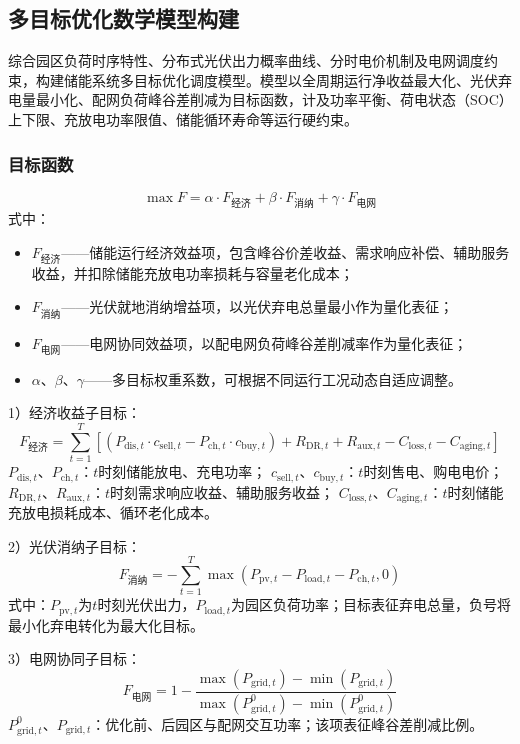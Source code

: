 \documentclass[12pt,a4paper]{article}
\begin{document}
\subsection{多目标优化数学模型构建}
综合园区负荷时序特性、分布式光伏出力概率曲线、分时电价机制及电网调度约束，构建储能系统多目标优化调度模型。模型以全周期运行净收益最大化、光伏弃电量最小化、配网负荷峰谷差削减为目标函数，计及功率平衡、荷电状态（SOC）上下限、充放电功率限值、储能循环寿命等运行硬约束。

\subsubsection{目标函数}
\[
\max F = \alpha \cdot F_{\text{经济}} + \beta \cdot F_{\text{消纳}} + \gamma \cdot F_{\text{电网}}
\]
式中：
\begin{itemize}
    \item $F_{\text{经济}}$——储能运行经济效益项，包含峰谷价差收益、需求响应补偿、辅助服务收益，并扣除储能充放电功率损耗与容量老化成本；
    \item $F_{\text{消纳}}$——光伏就地消纳增益项，以光伏弃电总量最小作为量化表征；
    \item $F_{\text{电网}}$——电网协同效益项，以配电网负荷峰谷差削减率作为量化表征；
    \item $\alpha、\beta、\gamma$——多目标权重系数，可根据不同运行工况动态自适应调整。
\end{itemize}

1）经济收益子目标：
\[
F_{\text{经济}}=\sum_{t=1}^{T}\left[\left(P_{\text{dis},t}\cdot c_{\text{sell},t}-P_{\text{ch},t}\cdot c_{\text{buy},t}\right)+R_{\text{DR},t}+R_{\text{aux},t}-C_{\text{loss},t}-C_{\text{aging},t}\right]
\]
$P_{\text{dis},t}、P_{\text{ch},t}$：$t$时刻储能放电、充电功率；
$c_{\text{sell},t}、c_{\text{buy},t}$：$t$时刻售电、购电电价；
$R_{\text{DR},t}、R_{\text{aux},t}$：$t$时刻需求响应收益、辅助服务收益；
$C_{\text{loss},t}、C_{\text{aging},t}$：$t$时刻储能充放电损耗成本、循环老化成本。

2）光伏消纳子目标：
\[
F_{\text{消纳}}=-\sum_{t=1}^{T}\max\left(P_{\text{pv},t}-P_{\text{load},t}-P_{\text{ch},t},0\right)
\]
式中：$P_{\text{pv},t}$为$t$时刻光伏出力，$P_{\text{load},t}$为园区负荷功率；目标表征弃电总量，负号将最小化弃电转化为最大化目标。

3）电网协同子目标：
\[
F_{\text{电网}}=1-\frac{\max\left(P_{\text{grid},t}\right)-\min\left(P_{\text{grid},t}\right)}{\max\left(P_{\text{grid},t}^{0}\right)-\min\left(P_{\text{grid},t}^{0}\right)}
\]
$P_{\text{grid},t}^{0}、P_{\text{grid},t}$：优化前、后园区与配网交互功率；该项表征峰谷差削减比例。
\end{document}
